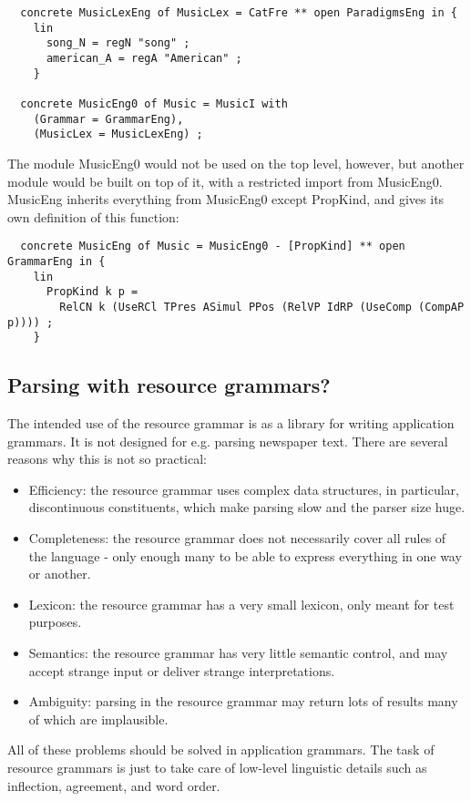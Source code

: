 \documentclass[11pt,a4paper]{article}
\begin{document}
\begin{verbatim}
  concrete MusicLexEng of MusicLex = CatFre ** open ParadigmsEng in {
    lin
      song_N = regN "song" ;
      american_A = regA "American" ;
    }

  concrete MusicEng0 of Music = MusicI with
    (Grammar = GrammarEng),
    (MusicLex = MusicLexEng) ;
\end{verbatim}
The module MusicEng0 would not be used on the top level, however, but
another module would be built on top of it, with a restricted import from
MusicEng0. MusicEng inherits everything from MusicEng0 except PropKind, and
gives its own definition of this function:

\begin{verbatim}
  concrete MusicEng of Music = MusicEng0 - [PropKind] ** open GrammarEng in {
    lin
      PropKind k p = 
        RelCN k (UseRCl TPres ASimul PPos (RelVP IdRP (UseComp (CompAP p)))) ;
    }
\end{verbatim}

\subsection{Parsing with resource grammars?}
The intended use of the resource grammar is as a library for writing
application grammars. It is not designed for e.g. parsing newspaper text. There
are several reasons why this is not so practical:

\begin{itemize}
\item Efficiency: the resource grammar uses complex data structures, in
particular, discontinuous constituents, which make parsing slow and the
parser size huge.
\item Completeness: the resource grammar does not necessarily cover all rules
of the language - only enough many to be able to express everything
in one way or another.
\item Lexicon: the resource grammar has a very small lexicon, only meant for test
purposes.
\item Semantics: the resource grammar has very little semantic control, and may
accept strange input or deliver strange interpretations.
\item Ambiguity: parsing in the resource grammar may return lots of results many
of which are implausible.
\end{itemize}

All of these problems should be solved in application grammars. 
The task of resource grammars is just to take care of low-level linguistic 
details such as inflection, agreement, and word order.
\end{document}
